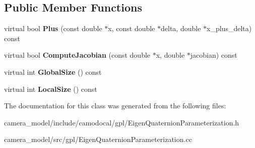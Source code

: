 \subsection*{Public Member Functions}
\begin{DoxyCompactItemize}
\item 
\mbox{\label{classcamodocal_1_1EigenQuaternionParameterization_a536708d4a3e63f004fc53536bb52a99c}} 
virtual bool {\bfseries Plus} (const double $\ast$x, const double $\ast$delta, double $\ast$x\+\_\+plus\+\_\+delta) const
\item 
\mbox{\label{classcamodocal_1_1EigenQuaternionParameterization_a86731e8edac30b9b5dfc3b0c8d49eef4}} 
virtual bool {\bfseries Compute\+Jacobian} (const double $\ast$x, double $\ast$jacobian) const
\item 
\mbox{\label{classcamodocal_1_1EigenQuaternionParameterization_a6457c07b1ff1da939422df0de21d5f16}} 
virtual int {\bfseries Global\+Size} () const
\item 
\mbox{\label{classcamodocal_1_1EigenQuaternionParameterization_a7043466bbaca16c7071b73f142ff5581}} 
virtual int {\bfseries Local\+Size} () const
\end{DoxyCompactItemize}


The documentation for this class was generated from the following files\+:\begin{DoxyCompactItemize}
\item 
camera\+\_\+model/include/camodocal/gpl/Eigen\+Quaternion\+Parameterization.\+h\item 
camera\+\_\+model/src/gpl/Eigen\+Quaternion\+Parameterization.\+cc\end{DoxyCompactItemize}
